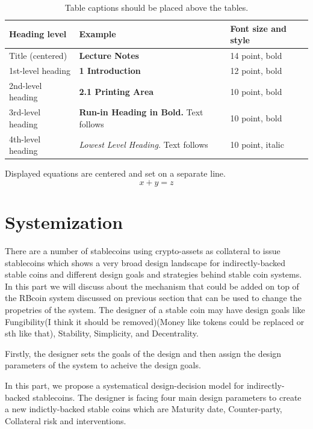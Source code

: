 \documentclass[runningheads]{llncs}
\begin{document}
\begin{table}
\caption{Table captions should be placed above the
tables.}\label{tab1}
\begin{tabular}{|l|l|l|}
\hline
Heading level &  Example & Font size and style\\
\hline
Title (centered) &  {\Large\bfseries Lecture Notes} & 14 point, bold\\
1st-level heading &  {\large\bfseries 1 Introduction} & 12 point, bold\\
2nd-level heading & {\bfseries 2.1 Printing Area} & 10 point, bold\\
3rd-level heading & {\bfseries Run-in Heading in Bold.} Text follows & 10 point, bold\\
4th-level heading & {\itshape Lowest Level Heading.} Text follows & 10 point, italic\\
\hline
\end{tabular}
\end{table}


\noindent Displayed equations are centered and set on a separate
line.
\begin{equation}
x + y = z
\end{equation}



\section{Systemization}
There are a number of stablecoins using crypto-assets as collateral to issue stablecoins which shows a very broad design landscape for indirectly-backed stable coins and different design goals and strategies behind stable coin systems. In this part we will discuss about the mechanism that could be added on top of the RBcoin system discussed on previous section that can be used to change the propetries of the system. The designer of a stable coin may have design goals like Fungibility(I think it should be removed)(Money like tokens could be replaced or sth like that), Stability, Simplicity, and Decentrality. 

Firstly, the designer sets the goals of the design and then assign the design parameters of the system to acheive the design goals.

In this part, we propose a systematical design-decision model for indirectly-backed stablecoins. The designer is facing four main design parameters to create a new indictly-backed stable coins which are Maturity date, Counter-party, Collateral risk and interventions. 
\end{document}

